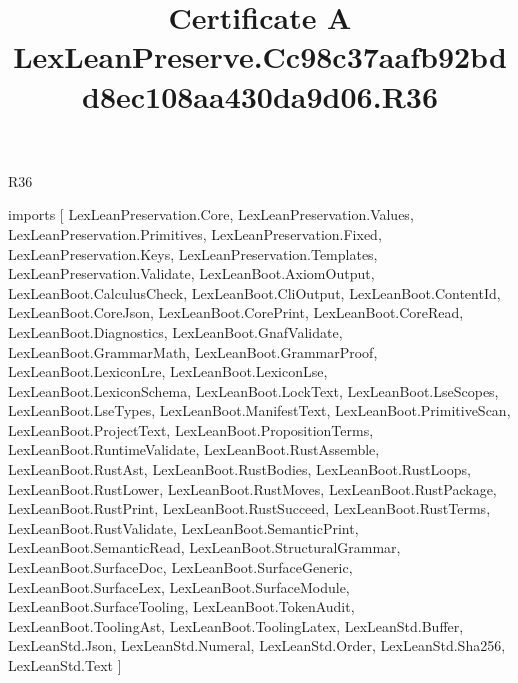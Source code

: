 \begin{lexlean}{R36}
\title{Certificate A LexLeanPreserve.Cc98c37aafb92bdd8ec108aa430da9d06.R36}
\begin{coremodule}
imports [
  LexLeanPreservation.Core,
  LexLeanPreservation.Values,
  LexLeanPreservation.Primitives,
  LexLeanPreservation.Fixed,
  LexLeanPreservation.Keys,
  LexLeanPreservation.Templates,
  LexLeanPreservation.Validate,
  LexLeanBoot.AxiomOutput,
  LexLeanBoot.CalculusCheck,
  LexLeanBoot.CliOutput,
  LexLeanBoot.ContentId,
  LexLeanBoot.CoreJson,
  LexLeanBoot.CorePrint,
  LexLeanBoot.CoreRead,
  LexLeanBoot.Diagnostics,
  LexLeanBoot.GnafValidate,
  LexLeanBoot.GrammarMath,
  LexLeanBoot.GrammarProof,
  LexLeanBoot.LexiconLre,
  LexLeanBoot.LexiconLse,
  LexLeanBoot.LexiconSchema,
  LexLeanBoot.LockText,
  LexLeanBoot.LseScopes,
  LexLeanBoot.LseTypes,
  LexLeanBoot.ManifestText,
  LexLeanBoot.PrimitiveScan,
  LexLeanBoot.ProjectText,
  LexLeanBoot.PropositionTerms,
  LexLeanBoot.RuntimeValidate,
  LexLeanBoot.RustAssemble,
  LexLeanBoot.RustAst,
  LexLeanBoot.RustBodies,
  LexLeanBoot.RustLoops,
  LexLeanBoot.RustLower,
  LexLeanBoot.RustMoves,
  LexLeanBoot.RustPackage,
  LexLeanBoot.RustPrint,
  LexLeanBoot.RustSucceed,
  LexLeanBoot.RustTerms,
  LexLeanBoot.RustValidate,
  LexLeanBoot.SemanticPrint,
  LexLeanBoot.SemanticRead,
  LexLeanBoot.StructuralGrammar,
  LexLeanBoot.SurfaceDoc,
  LexLeanBoot.SurfaceGeneric,
  LexLeanBoot.SurfaceLex,
  LexLeanBoot.SurfaceModule,
  LexLeanBoot.SurfaceTooling,
  LexLeanBoot.TokenAudit,
  LexLeanBoot.ToolingAst,
  LexLeanBoot.ToolingLatex,
  LexLeanStd.Buffer,
  LexLeanStd.Json,
  LexLeanStd.Numeral,
  LexLeanStd.Order,
  LexLeanStd.Sha256,
  LexLeanStd.Text
]


\end{coremodule}
\end{lexlean}
